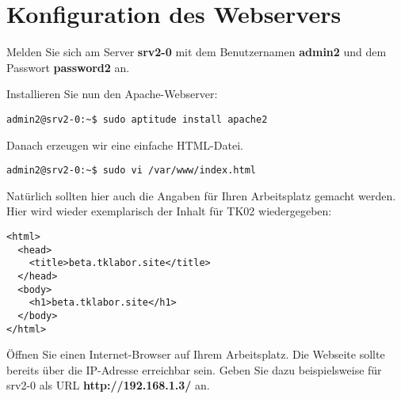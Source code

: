 \section{Konfiguration des Webservers}

Melden Sie sich am Server \textbf{srv2-0} mit dem Benutzernamen \textbf{admin2}
und dem Passwort \textbf{password2} an.

Installieren Sie nun den Apache-Webserver:
\begin{lstlisting}
admin2@srv2-0:~$ sudo aptitude install apache2
\end{lstlisting}

Danach erzeugen wir eine einfache HTML-Datei.
\begin{lstlisting}
admin2@srv2-0:~$ sudo vi /var/www/index.html
\end{lstlisting}
Natürlich sollten hier auch die Angaben für Ihren Arbeitsplatz gemacht werden. Hier wird wieder exemplarisch 
der Inhalt für TK02 wiedergegeben:
\begin{lstlisting}
<html>
  <head>
    <title>beta.tklabor.site</title>
  </head>  
  <body>
    <h1>beta.tklabor.site</h1>
  </body>
</html>
\end{lstlisting}
Öffnen Sie einen Internet-Browser auf Ihrem Arbeitsplatz. Die Webseite sollte bereits über die IP-Adresse erreichbar sein. Geben Sie dazu
beispielsweise für srv2-0 als URL \textbf{http://192.168.1.3/} an.
